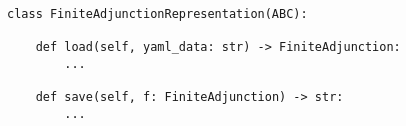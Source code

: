 \begin{verbatim}
class FiniteAdjunctionRepresentation(ABC):

    def load(self, yaml_data: str) -> FiniteAdjunction:
        ...

    def save(self, f: FiniteAdjunction) -> str:
        ...
\end{verbatim}